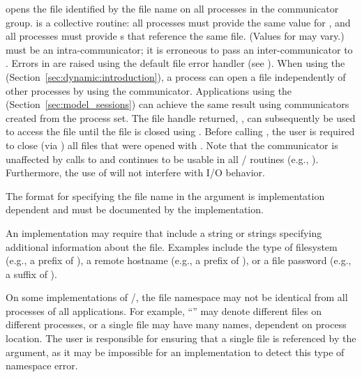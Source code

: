  opens the file identified by the file name
 on all processes in the  communicator group.
 is a collective routine:
all processes must provide the same value for ,
and all processes must provide s that
reference the same file.
(Values for  may vary.)
 must be an intra-communicator;
it is erroneous to pass an inter-communicator to .
Errors in  are raised 
using the default file error handler
(see ).
When using the \wpm{}\mpitermindex{\wpm} (Section~\ref{sec:dynamic:introduction}),
a process can open a file independently of other processes
by using the  communicator.
Applications using the \spm{} (Section~\ref{sec:model_sessions})\mpitermindex{\spm} can achieve the same result using communicators created from the  process set.
The file handle returned, ,
can subsequently be used to access the file until the file is
closed using .
Before calling ,
the user is required to close (via )
all files that were opened with .
Note that the communicator  is unaffected by calls to 
and continues to be usable in all \MPI/ routines (e.g., ).
Furthermore, the use of  will not interfere with I/O behavior.

The format for specifying the file name in the 
argument is implementation dependent
and must be documented by the implementation.

\begin{implementors}
An implementation may require that  include
a string or strings specifying additional information about the file.
Examples include the type of filesystem (e.g., a prefix of ),
a remote hostname (e.g., a prefix of ),
or a file password (e.g., a suffix of ).
\end{implementors}

\begin{users}
On some implementations of \MPI/,
the file namespace may not be identical from all processes of all applications.
For example,
``'' may denote different files on different processes,
or a single file may have many names, dependent on process location.
The user is responsible for ensuring that a single file
is referenced by the  argument,
as it may be impossible for an implementation to detect
this type of namespace error.
\end{users}

